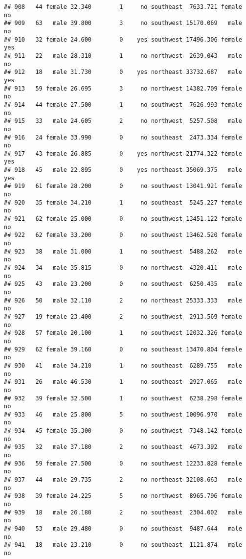 \documentclass[
]{article}
\begin{document}
\begin{verbatim}
## 908   44 female 32.340        1     no southeast  7633.721 female       no
## 909   63   male 39.800        3     no southwest 15170.069   male       no
## 910   32 female 24.600        0    yes southwest 17496.306 female      yes
## 911   22   male 28.310        1     no northwest  2639.043   male       no
## 912   18   male 31.730        0    yes northeast 33732.687   male      yes
## 913   59 female 26.695        3     no northwest 14382.709 female       no
## 914   44 female 27.500        1     no southwest  7626.993 female       no
## 915   33   male 24.605        2     no northwest  5257.508   male       no
## 916   24 female 33.990        0     no southeast  2473.334 female       no
## 917   43 female 26.885        0    yes northwest 21774.322 female      yes
## 918   45   male 22.895        0    yes northeast 35069.375   male      yes
## 919   61 female 28.200        0     no southwest 13041.921 female       no
## 920   35 female 34.210        1     no southeast  5245.227 female       no
## 921   62 female 25.000        0     no southwest 13451.122 female       no
## 922   62 female 33.200        0     no southwest 13462.520 female       no
## 923   38   male 31.000        1     no southwest  5488.262   male       no
## 924   34   male 35.815        0     no northwest  4320.411   male       no
## 925   43   male 23.200        0     no southwest  6250.435   male       no
## 926   50   male 32.110        2     no northeast 25333.333   male       no
## 927   19 female 23.400        2     no southwest  2913.569 female       no
## 928   57 female 20.100        1     no southwest 12032.326 female       no
## 929   62 female 39.160        0     no southeast 13470.804 female       no
## 930   41   male 34.210        1     no southeast  6289.755   male       no
## 931   26   male 46.530        1     no southeast  2927.065   male       no
## 932   39 female 32.500        1     no southwest  6238.298 female       no
## 933   46   male 25.800        5     no southwest 10096.970   male       no
## 934   45 female 35.300        0     no southwest  7348.142 female       no
## 935   32   male 37.180        2     no southeast  4673.392   male       no
## 936   59 female 27.500        0     no southwest 12233.828 female       no
## 937   44   male 29.735        2     no northeast 32108.663   male       no
## 938   39 female 24.225        5     no northwest  8965.796 female       no
## 939   18   male 26.180        2     no southeast  2304.002   male       no
## 940   53   male 29.480        0     no southeast  9487.644   male       no
## 941   18   male 23.210        0     no southeast  1121.874   male       no

\end{verbatim}
\end{document}
